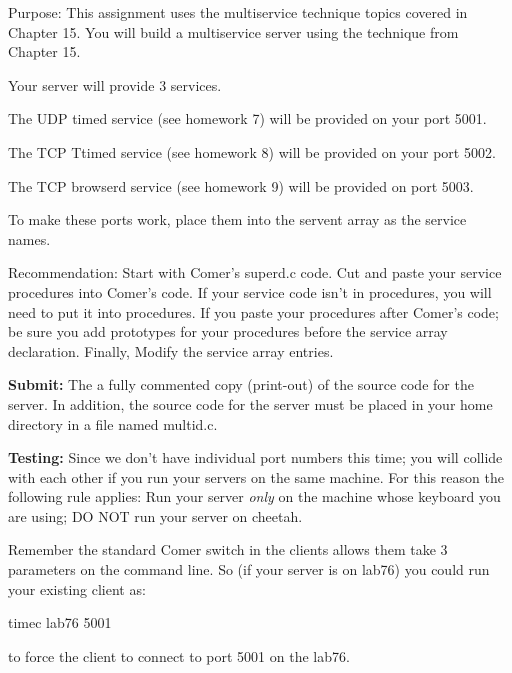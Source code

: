 

\parindent 0pt

Purpose: This assignment uses the multiservice technique
topics covered in Chapter 15.
You will build a multiservice server
using the technique from Chapter 15.

Your server will provide 3 services.

The UDP {\ltt{}timed} service (see homework 7) will be provided
on your port 5001.

The TCP {\ltt{}Ttimed} service (see homework 8) will be provided
on your port 5002.

The TCP {\ltt{}browserd} service (see homework 9) will be provided
on port 5003.

To make these ports work, place them into the {\ltt{}servent} array
as the service names.

Recommendation: Start with Comer's {\ltt{}superd.c} code.
Cut and paste your service procedures into Comer's code.
If your service code isn't in procedures, you will need to put it 
into procedures.
If you paste your procedures after Comer's code; be sure you
add prototypes for your procedures before the service array declaration.
Finally, Modify the service array entries.

{\bf Submit:} The a fully commented copy (print-out) of the source code for the 
server.
In addition,
the source code for the server must be placed in your home directory
in a file named {\ltt{}multid.c}.

{\bf Testing:}
Since we don't have individual port numbers this time; you will
collide with each other if you run your servers on the same machine.
For this reason the following rule applies:
Run your server {\it only} on the machine whose keyboard you are using;
DO NOT run your server on {\ltt{}cheetah}.

Remember the standard Comer switch in the clients allows them
take 3 parameters on the command line.
So (if your server is on {\ltt{}lab76}) you could run your existing client as:

{\ltt{}timec lab76 5001}

to force the client to connect to port 5001 on the lab76. 

\bye
